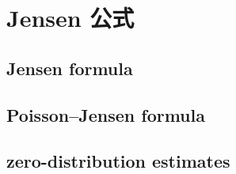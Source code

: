 \section{Jensen 公式}
\label{b3:sec:1802}


\subsection{Jensen formula}
\label{b3:subsec:180201}

\subsection{Poisson–Jensen formula}
\label{b3:subsec:180202}

\subsection{zero-distribution estimates}
\label{b3:subsec:180203}


